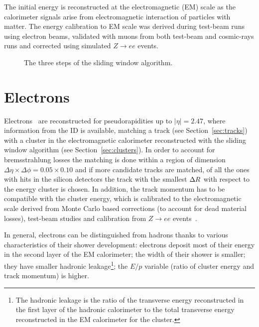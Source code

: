 The initial energy is reconstructed at the electromagnetic (EM) scale as
the calorimeter signals arise from electromagnetic interaction of
particles with matter. The energy calibration to EM scale was derived
during test-beam runs using electron beams, validated with muons
from both test-beam and cosmic-rays runs and corrected using simulated $Z\to ee$ events.

\begin{figure}[tb]\begin{center}
	\caption{The three steps of the sliding window algorithm.
	\label{fig:sliding}}
\end{center}\end{figure}

\section{Electrons}\label{sec:electrons}

Electrons~\cite{eperf} are reconstructed for pseudorapidities up to $|\eta| = 2.47$, where
information from the ID is available, matching a track (see Section~\ref{sec:tracks}) 
with a cluster in the electromagnetic calorimeter reconstructed with the sliding window 
algorithm (see Section~\ref{sec:clusters}).
In order to account for bremsstrahlung losses the matching is done within a region
of dimension $\Delta\eta\times\Delta\phi=0.05\times0.10$ and if more candidate
tracks are matched, of all the ones with hits in the silicon detectors
the track with the smallest $\dr$ with respect to the
energy cluster is chosen. In addition, the track momentum has to be compatible
with the cluster energy, which is calibrated to the electromagnetic scale
derived from Monte Carlo based corrections (to account for dead material losses),
test-beam studies and calibration from $Z\to ee$ events~\cite{Abat:1900zz}.

In general, electrons can be distinguished from hadrons thanks to various characteristics
of their shower development: electrons deposit most of their energy in the second layer of
the EM calorimeter; the width of their shower is smaller; they have smaller
hadronic leakage\footnote{The hadronic leakage is the ratio of the transverse energy reconstructed
in the first layer of the hadronic calorimeter to the total  transverse energy reconstructed in the 
EM calorimeter for the cluster.}; the $E/p$ variable (ratio of cluster energy and track momentum) is higher.


